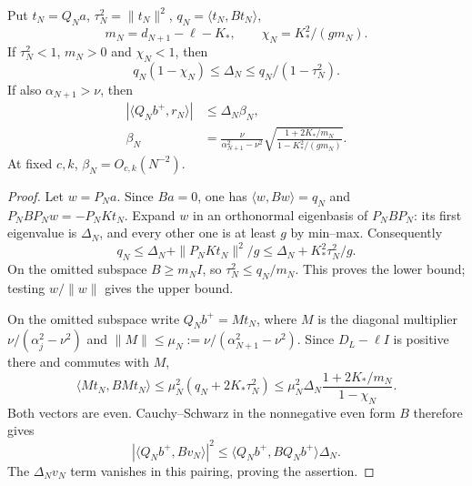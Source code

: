 \begin{proposition}
\label{prop:mode-transfer-tail}
Put $t_N=Q_Na$, $\tau_N^2=\|t_N\|^2$, $q_N=\langle t_N,Bt_N\rangle$,
\[
 m_N=d_{N+1}-\ell-K_*,\qquad \chi_N=K_*^2/(g m_N).
\]
If $\tau_N^2<1$, $m_N>0$ and $\chi_N<1$, then
\begin{equation}\label{eq:mode-transfer-energy}
 q_N(1-\chi_N)\le\Delta_N\le q_N/(1-\tau_N^2).
\end{equation}
If also $\alpha_{N+1}>\nu$, then
\begin{align}
 |\langle Q_Nb^+,r_N\rangle|&\le\Delta_N\beta_N,
 \label{eq:mode-transfer-tail}\\
 \beta_N&=\frac{\nu}{\alpha_{N+1}^2-\nu^2}
 \sqrt{\frac{1+2K_*/m_N}{1-K_*^2/(g m_N)}}.
 \nonumber
\end{align}
At fixed $c,k$, $\beta_N=O_{c,k}(N^{-2})$.
\end{proposition}
\begin{proof}
Let $w=P_Na$. Since $Ba=0$, one has $\langle w,Bw\rangle=q_N$
and $P_NBP_Nw=-P_NKt_N$. Expand $w$ in an orthonormal eigenbasis of
$P_NBP_N$: its first eigenvalue is $\Delta_N$, and every other one is
at least $g$ by min--max. Consequently
\[
 q_N\le\Delta_N+\|P_NKt_N\|^2/g
       \le\Delta_N+K_*^2\tau_N^2/g.
\]
On the omitted subspace $B\ge m_N I$, so $\tau_N^2\le q_N/m_N$.
This proves the lower bound; testing $w/\|w\|$ gives the upper bound.

On the omitted subspace write $Q_Nb^+=Mt_N$, where $M$ is the diagonal
multiplier $\nu/(\alpha_j^2-\nu^2)$ and
$\|M\|\le\mu_N:=\nu/(\alpha_{N+1}^2-\nu^2)$.
Since $D_L-\ell I$ is positive there and commutes with $M$,
\[
 \langle Mt_N,BMt_N\rangle
 \le\mu_N^2(q_N+2K_*\tau_N^2)
 \le\mu_N^2\Delta_N\frac{1+2K_*/m_N}{1-\chi_N}.
\]
Both vectors are even. Cauchy--Schwarz in the nonnegative even form $B$
therefore gives
\[
 |\langle Q_Nb^+,Bv_N\rangle|^2
 \le\langle Q_Nb^+,BQ_Nb^+\rangle\Delta_N.
\]
The $\Delta_N v_N$ term vanishes in this pairing, proving the assertion.
\end{proof}

